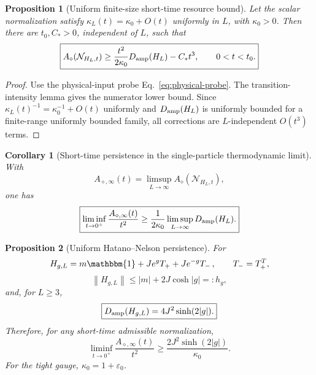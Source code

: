 \documentclass[reprint,amsmath,amssymb,aps,nofootinbib]{revtex4-2}
\newtheorem{proposition}{Proposition}
\newtheorem{corollary}{Corollary}
\newcommand{\id}{\mathbbm{1}}
\newcommand{\Damp}{D_{\rm amp}}
\newcommand{\norm}[1]{\left\lVert #1\right\rVert}
\begin{document}
\begin{proposition}[Uniform finite-size short-time resource bound]
Let the scalar normalization satisfy
$\kappa_L(t)=\kappa_0+O(t)$ uniformly in $L$, with $\kappa_0>0$. Then there are $t_0,C_*>0$,
independent of $L$, such that
\begin{equation}
\boxed{
A_\diamond(\mathcal N_{H_L,t})
\ge
\frac{t^2}{2\kappa_0}\Damp(H_L)-C_*t^3,
\qquad0<t<t_0.}
\end{equation}
\end{proposition}

\begin{proof}
Use the physical-input probe Eq.~\eqref{eq:physical-probe}. The transition-intensity lemma gives
the numerator lower bound. Since $\kappa_L(t)^{-1}=\kappa_0^{-1}+O(t)$ uniformly and
$\Damp(H_L)$ is uniformly bounded for a finite-range uniformly bounded family, all corrections
are $L$-independent $O(t^3)$ terms.
\end{proof}

\begin{corollary}[Short-time persistence in the single-particle thermodynamic limit]
With
\begin{equation}
A_{\diamond,\infty}(t)=\limsup_{L\to\infty}A_\diamond(\mathcal N_{H_L,t}),
\end{equation}
one has
\begin{equation}
\boxed{
\liminf_{t\to0^+}\frac{A_{\diamond,\infty}(t)}{t^2}
\ge
\frac1{2\kappa_0}\limsup_{L\to\infty}\Damp(H_L).}
\end{equation}
\end{corollary}

\begin{proposition}[Uniform Hatano--Nelson persistence]
For
\begin{equation}
H_{g,L}=m\id+Je^gT_++Je^{-g}T_-\,,\qquad T_-=T_+^T,
\end{equation}
\begin{equation}
\norm{H_{g,L}}\le|m|+2J\cosh|g|=:h_g,
\end{equation}
and, for $L\ge3$,
\begin{equation}
\boxed{\Damp(H_{g,L})=4J^2\sinh(2|g|).}
\end{equation}
Therefore, for any short-time admissible normalization,
\begin{equation}
\boxed{
\liminf_{t\to0^+}
\frac{A_{\diamond,\infty}(t)}{t^2}
\ge
\frac{2J^2\sinh(2|g|)}{\kappa_0}.}
\end{equation}
For the tight gauge, $\kappa_0=1+\varepsilon_0$.
\end{proposition}
\end{document}
